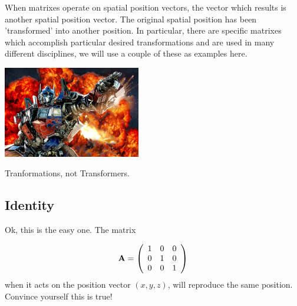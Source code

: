 \documentclass{tufte-handout}
\begin{document}

When matrixes operate on spatial position vectors, the vector which results is another spatial position vector.  The original spatial position has been 'transformed' into another position.  In particular, there are specific matrixes which accomplish particular desired transformations and are used in many different disciplines, we will use a couple of these as examples here.

\begin{marginfigure}
\includegraphics[width=6cm]{Transformer.jpg}
\caption{Tranformations, not Transformers.}
\end{marginfigure}


\subsection{Identity}  Ok, this is the easy one.  The matrix

\begin{equation}
{\bf A} = \left( \begin{array}{ccc}
   1 & 0 & 0 \\
   0 & 1 & 0 \\
   0 & 0 & 1
 \end{array} \right)
\end{equation}
when it acts on the position vector $(x,y,z)$, will reproduce the same position.  Convince yourself this is true!
\end{document}
